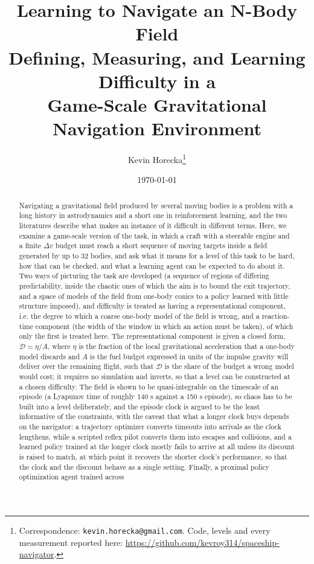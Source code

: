 \documentclass[11pt]{article}
\title{\bf Learning to Navigate an N-Body Field\\[2pt]
\large Defining, Measuring, and Learning Difficulty in a\\
Game-Scale Gravitational Navigation Environment}
\author{Kevin Horecka\thanks{Correspondence: \texttt{kevin.horecka@gmail.com}.
Code, levels and every measurement reported here:
\url{https://github.com/kevroy314/spaceship-navigator}.}}
\date{\today}
\newcommand{\dd}{\mathcal{D}}
\begin{document}
\maketitle

\begin{abstract}
Navigating a gravitational field produced by several moving bodies is a
problem with a long history in astrodynamics and a short one in reinforcement
learning, and the two literatures describe what makes an instance of it
difficult in different terms. Here, we examine a game-scale version of the
task, in which a craft with a steerable engine and a finite $\Delta v$ budget must
reach a short sequence of moving targets inside a field generated by up to 32
bodies, and ask what it means for a level of this task to be hard, how that
can be checked, and what a learning agent can be expected to do about it.
Two ways of picturing the task are developed (a sequence of regions of
differing predictability, inside the chaotic ones of which the aim is to
bound the exit trajectory, and a space of models of the field from one-body
conics to a policy learned with little structure imposed), and difficulty is treated as
having a representational component, i.e. the degree to which a coarse
one-body model of the field is wrong, and a reaction-time component (the
width of the window in which an action must be taken), of which only the
first is treated here. The representational component is given a closed form,
$\dd = \eta/A$, where $\eta$ is the fraction of the local gravitational
acceleration that a one-body model discards and $A$ is the fuel budget
expressed in units of the impulse gravity will deliver over the remaining
flight, such that $\dd$ is the share of the budget a wrong model would cost; it
requires no simulation and inverts, so that a level can be constructed at a
chosen difficulty. The field is shown to be quasi-integrable on the timescale
of an episode (a Lyapunov time of roughly 140 s against a 150 s episode), so
chaos has to be built into a level deliberately, and the episode clock is
argued to be the least informative of the constraints, with the caveat that
what a longer clock buys depends on the navigator: a trajectory optimizer
converts timeouts into arrivals as the clock lengthens, while a scripted
reflex pilot converts them into escapes and collisions, and a learned policy
trained at the longer clock mostly fails to arrive at all unless its discount
is raised to match, at which point it recovers the shorter clock's
performance, so that the clock and the discount behave as a single setting. Finally, a proximal policy optimization agent trained across

\end{abstract}
\end{document}

